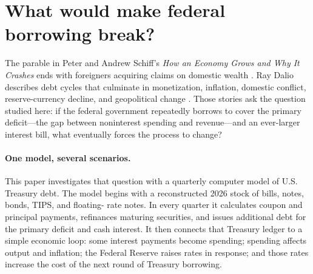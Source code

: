 \documentclass[11pt]{article}
\begin{document}
\begin{abstract}
The paper then gives that break a conditional recovery.  The central private-clearing path
ends 2039Q2 with inflation at 4.89 percent, debt at 178.82 percent of GDP, annualized interest
expense at 20.49 percent of GDP, and the Fed's short-rate setting at 8.72 percent.  Beginning
in 2039Q3, a joint settlement is assumed to lower marginal Treasury rates gradually, permit
inflation to peak at 5.2 percent, and cause one year of negative 1-percent real growth.  The
cohort solver finds that a permanent primary-balance improvement of 5.48 percent of GDP,
phased in over four years, returns debt/GDP to 178.82 percent by 2056 and leaves it falling.
Debt first peaks at 209.27 percent in 2043; interest expense declines to 8.88 percent of GDP
and inflation to 2.5 percent by 2056.  The same favorable growth, inflation, and rate paths
without the fiscal package end at 265.14 percent debt/GDP.  The recovery's macro and yield
paths are declared assumptions; the required fiscal adjustment and Treasury cash flows are
the computed results.  Business as usual breaks, but a joint settlement reached at the
financing boundary prevents the later double-digit-inflation endgame.
\end{abstract}

\section{What would make federal borrowing break?}

The parable in Peter and Andrew Schiff's \emph{How an Economy Grows and Why It Crashes}
ends with foreigners acquiring claims on domestic wealth \cite{schiff}.  Ray Dalio describes
debt cycles that culminate in monetization, inflation, domestic conflict, reserve-currency
decline, and geopolitical change \cite{dalioChangingOrder,dalioDebtCycle}.  Those stories ask
the question studied here: if the federal government repeatedly borrows to cover the primary
deficit---the gap between noninterest spending and revenue---and an ever-larger interest bill,
what eventually forces the process to change?

\paragraph{One model, several scenarios.}
This paper investigates that question with a quarterly computer model of U.S. Treasury debt.
The model begins with a reconstructed 2026 stock of bills, notes, bonds, TIPS, and floating-
rate notes.  In every quarter it calculates coupon and principal payments, refinances maturing
securities, and issues additional debt for the primary deficit and cash interest.  It then
connects that Treasury ledger to a simple economic loop: some interest payments become
spending; spending affects output and inflation; the Federal Reserve raises rates in response;
and those rates increase the cost of the next round of Treasury borrowing.
\end{document}
